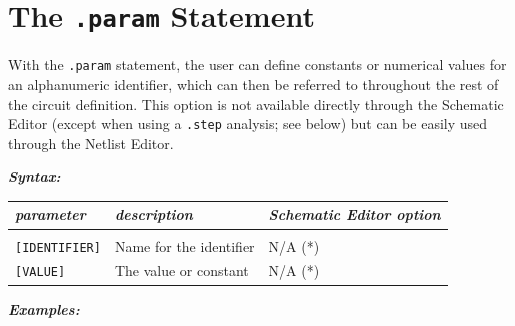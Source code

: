 
\section{The \texttt{.param} Statement}
\label{sec_satco_paramstatement}

With the \texttt{.param} statement, the user can define constants or numerical values for an alphanumeric identifier, which can then be referred to throughout the rest of the circuit definition.    This option is not available directly through the Schematic Editor (except when using a \texttt{.step} analysis; see below) but can be easily used through the Netlist Editor. 

\textbf{\textit{Syntax:}}


\begin{tabular}{lp{5.5cm}p{5cm}}
\textit{parameter} & \textit{description} & \textit{Schematic Editor option}\\ \hline \\ \vspace{-0.8\parskip}
\texttt{[IDENTIFIER]} & Name for the identifier & \textsf{N/A (*)} \\
\texttt{[VALUE]} & The value or constant & \textsf{N/A (*)} 
\end{tabular}


\textbf{\textit{Examples:}}

